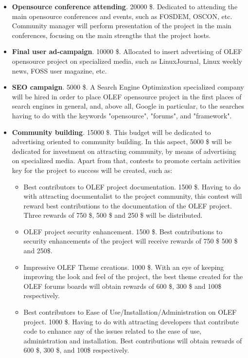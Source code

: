 \documentclass[11pt]{article}
\begin{document}
\begin{itemize}\itemsep0pt
\item{\textbf{Opensource conference attending}}. 20000 \$. Dedicated to attending the main opensource conferences and events, such as FOSDEM, OSCON, etc. Community manager will perform presentation of the project in the main conferences, focusing on the main strengths that the project hosts.
\item{\textbf{Final user ad-campaign}}. 10000 \$. Allocated to insert advertising of OLEF opensource project on specialized media, such as LinuxJournal, Linux weekly news, FOSS user magazine, etc.
\item{\textbf{SEO campaign}}. 5000 \$. A Search Engine Optimization specialized company will be hired in order to place OLEF opensource project in the first places of search engines in general, and, above all, Google in particular, to the searches having to do with the keywords "opensource", "forums", and "framework".
\item{\textbf{Community building}}. 15000 \$. This budget will be dedicated to advertising oriented to community building. In this aspect, 5000 \$ will be dedicated for investment on attracting community, by means of advertising on specialized media. Apart from that, contests to promote certain activities key for the project to success will be created, such as:
\begin{itemize}
\item{Best contributors to OLEF project documentation}. 1500 \$. Having to do with attracting documentalist to the project community, this contest will reward best contributions to the documentation of the OLEF project. Three rewards of 750 \$, 500 \$ and 250 \$ will be distributed.
\item{OLEF project security enhancement}. 1500 \$. Best contributions to security enhancements of the project will receive rewards of 750 \$ 500 \$ and 250\$.
\item{Impressive OLEF Theme creations}. 1000 \$. With an eye of keeping improving the look and feel of the project, the best theme created for the OLEF forums boards will obtain rewards of 600 \$,  300 \$ and 100\$ respectively.
\item{Best contributors to Ease of Use/Installation/Administration on OLEF project}.
1000 \$. Having to do with attracting developers that contribute code to enhance any of the issues related to the ease of use, administration and installation. Best contributions will obtain rewards of 600 \$, 300 \$, and 100\$ respectively.
\end{itemize}
\end{itemize}
\end{document}
